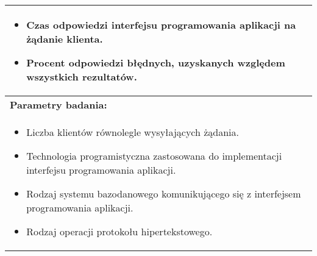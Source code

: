 \begin{longtable}[c]{|llll|}
    \multicolumn{4}{|p{\linewidth}|}{
        \begin{itemize}
            \item Czas odpowiedzi interfejsu programowania aplikacji na żądanie klienta.
            \item Procent odpowiedzi błędnych, uzyskanych względem wszystkich rezultatów.
        \end{itemize}
    }                                                           \\ \hline
    \multicolumn{4}{|l|}{\textbf{Parametry badania:}}                                \\ \hline
    \multicolumn{4}{|p{\linewidth}|}{
        \begin{itemize}
            \item Liczba klientów równolegle wysyłających żądania.
            \item Technologia programistyczna zastosowana do implementacji interfejsu programowania aplikacji.
            \item Rodzaj systemu bazodanowego komunikującego się z interfejsem programowania aplikacji.
            \item Rodzaj operacji protokołu hipertekstowego.
        \end{itemize}
    }                                                           \\ \hline
\end{longtable}


